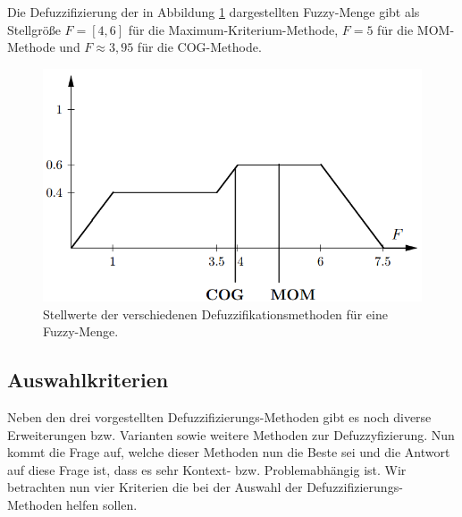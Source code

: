 \documentclass[12pt,a4paper,bibliography=totocnumbered,listof=totocnumbered]{scrartcl}
\theoremstyle{Umgebung}
\begin{document}
\begin{bsp}
	Die Defuzzifizierung der in Abbildung \ref{fig:defuzzy} dargestellten Fuzzy-Menge gibt als Stellgröße $F = \left[4,6\right]$ für die Maximum-Kriterium-Methode, $F = 5$ für die MOM-Methode und $F \approx 3,95$ für die COG-Methode.
\end{bsp}

\begin{figure}
	\centering
	\includegraphics[width=0.7\linewidth]{img/defuzzy/defuzzy}
	\caption{Stellwerte der verschiedenen Defuzzifikationsmethoden für eine Fuzzy-Menge.}
	\label{fig:defuzzy}
\end{figure}

\subsection{Auswahlkriterien}

Neben den drei vorgestellten Defuzzifizierungs-Methoden gibt es noch diverse Erweiterungen bzw. Varianten sowie weitere Methoden zur Defuzzyfizierung. Nun kommt die Frage auf, welche dieser Methoden nun die Beste sei und die Antwort auf diese Frage ist, dass es sehr Kontext- bzw. Problemabhängig ist. Wir betrachten nun vier Kriterien die bei der Auswahl der Defuzzifizierungs-Methoden helfen sollen.









\end{document}
